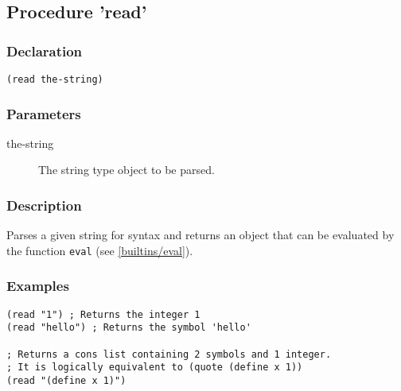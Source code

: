 \subsection{Procedure 'read'}
\label{builtins/read}

\subsubsection*{Declaration}
\begin{lstlisting}
(read the-string)
\end{lstlisting}

\subsubsection*{Parameters}
\begin{description}
	\item[the-string] The string type object to be parsed.
\end{description}

\subsubsection*{Description}
Parses a given string for \lisp{} syntax and returns an object that can be evaluated by the function \lstinline|eval| (see \ref{builtins/eval}).

\subsubsection*{Examples}
\begin{lstlisting}
(read "1") ; Returns the integer 1
(read "hello") ; Returns the symbol 'hello'

; Returns a cons list containing 2 symbols and 1 integer.
; It is logically equivalent to (quote (define x 1))
(read "(define x 1)")
\end{lstlisting}
